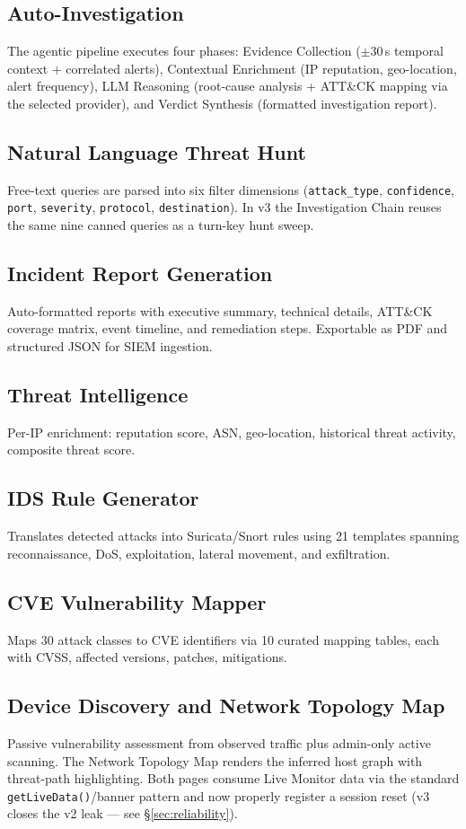 \documentclass[11pt,a4paper]{article}
\begin{document}
\subsection{Auto-Investigation}
The agentic pipeline executes four phases: Evidence Collection
($\pm$30\,s temporal context + correlated alerts), Contextual
Enrichment (IP reputation, geo-location, alert frequency), LLM
Reasoning (root-cause analysis + ATT\&CK mapping via the selected
provider), and Verdict Synthesis (formatted investigation report).

\subsection{Natural Language Threat Hunt}
Free-text queries are parsed into six filter dimensions
(\texttt{attack\_type}, \texttt{confidence}, \texttt{port},
\texttt{severity}, \texttt{protocol}, \texttt{destination}).  In v3
the Investigation Chain reuses the same nine canned queries as a
turn-key hunt sweep.

\subsection{Incident Report Generation}
Auto-formatted reports with executive summary, technical details,
ATT\&CK coverage matrix, event timeline, and remediation steps.
Exportable as PDF and structured JSON for SIEM ingestion.

\subsection{Threat Intelligence}
Per-IP enrichment: reputation score, ASN, geo-location, historical
threat activity, composite threat score.

\subsection{IDS Rule Generator}
Translates detected attacks into Suricata/Snort rules using 21
templates spanning reconnaissance, DoS, exploitation, lateral
movement, and exfiltration.

\subsection{CVE Vulnerability Mapper}
Maps 30 attack classes to CVE identifiers via 10 curated mapping
tables, each with CVSS, affected versions, patches, mitigations.

\subsection{Device Discovery and Network Topology Map}
Passive vulnerability assessment from observed traffic plus
admin-only active scanning.  The Network Topology Map renders the
inferred host graph with threat-path highlighting.  Both pages
consume Live Monitor data via the standard
\texttt{getLiveData()}/banner pattern and now properly register a
session reset (v3 closes the v2 leak --- see \S\ref{sec:reliability}).
\end{document}
